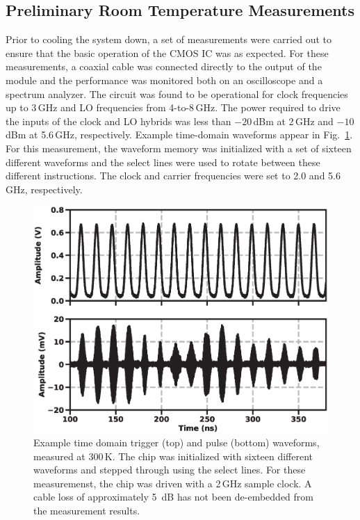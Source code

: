 \documentclass[journal]{IEEEtran}
\newcommand{\CR}[1]{{\color{black}#1}}
\begin{document}
\subsection{Preliminary Room Temperature Measurements}
Prior to cooling the system down, a set of measurements were carried out to ensure that the \CR{basic operation of the CMOS IC was as expected}. For these measurements, a coaxial cable was connected directly to the output of the module and the performance was monitored both on an oscilloscope and a spectrum analyzer.  %
\CR{The circuit was found to be operational for clock frequencies up to 3\,GHz and LO frequencies from 4-to-8\,GHz.} The power required to drive the inputs of the clock and LO hybrids was less than $-20\,$dBm at 2\,GHz and $-10\,$dBm at 5.6\,GHz, respectively.  Example time-domain waveforms appear in Fig.~\ref{timedomain}. For this measurement, the waveform memory was initialized with a set of sixteen different waveforms and the select lines were used to rotate between these different instructions. \CR{The clock and carrier frequencies were set to 2.0 and 5.6\,GHz, respectively}.
\begin{figure}[bt!]
\includegraphics[width=\columnwidth]{Figures/FIGURE_13}
\caption{Example time domain trigger (top) and pulse (bottom) waveforms, measured at 300\,K. The chip was initialized with sixteen different waveforms and stepped through using the select lines. For these measuremenst, the chip was driven with a 2\,GHz sample clock. A cable loss of approximately 5~dB has not been de-embedded from the measurement results.} \label{timedomain}
\end{figure}
\end{document}
